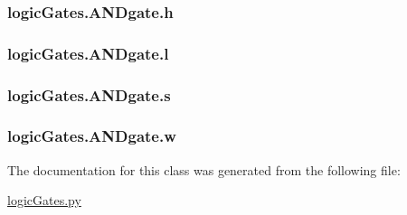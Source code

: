 \subsubsection[{h}]{\setlength{\rightskip}{0pt plus 5cm}logic\+Gates.\+A\+N\+Dgate.\+h}\label{classlogic_gates_1_1_a_n_dgate_ac8a2576cf72d2dc3112496a488c31beb}
\hypertarget{classlogic_gates_1_1_a_n_dgate_a3046ffd251165180bc29b35d5b260fc0}{}
\subsubsection[{l}]{\setlength{\rightskip}{0pt plus 5cm}logic\+Gates.\+A\+N\+Dgate.\+l}\label{classlogic_gates_1_1_a_n_dgate_a3046ffd251165180bc29b35d5b260fc0}
\hypertarget{classlogic_gates_1_1_a_n_dgate_a5b5585a3cf1bf9fd94fcc438987b14b2}{}
\subsubsection[{s}]{\setlength{\rightskip}{0pt plus 5cm}logic\+Gates.\+A\+N\+Dgate.\+s}\label{classlogic_gates_1_1_a_n_dgate_a5b5585a3cf1bf9fd94fcc438987b14b2}
\hypertarget{classlogic_gates_1_1_a_n_dgate_a4011635874a653e47fa69cd6ce968f36}{}
\subsubsection[{w}]{\setlength{\rightskip}{0pt plus 5cm}logic\+Gates.\+A\+N\+Dgate.\+w}\label{classlogic_gates_1_1_a_n_dgate_a4011635874a653e47fa69cd6ce968f36}


The documentation for this class was generated from the following file\+:\begin{DoxyCompactItemize}
\item 
\hyperlink{logic_gates_8py}{logic\+Gates.\+py}\end{DoxyCompactItemize}
